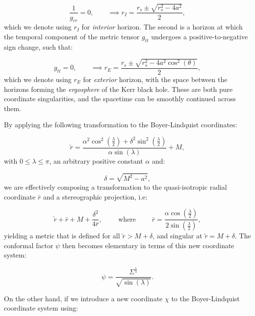 \documentclass{article}
\begin{document}
\begin{equation}
\frac{1}{g_{r r}} = 0, \qquad \implies r_I = \frac{r_s \pm \sqrt{r_{s}^{2} - 4 a^2}}{2},
\end{equation}
which we denote using ${r_I}$ for \textit{interior} horizon. The second is a horizon at which the temporal component of the metric tensor ${g_{t t}}$ undergoes a positive-to-negative sign change, such that:

\begin{equation}
g_{t t} = 0, \qquad \implies r_E = \frac{r_s \pm \sqrt{r_{s}^{2} - 4 a^2 \cos^2 \left( \theta \right)}}{2},
\end{equation}
which we denote using ${r_E}$ for \textit{exterior} horizon, with the space between the horizons forming the \textit{ergosphere} of the Kerr black hole. These are both pure coordinate singularities, and the spacetime can be smoothly continued across them.

By applying the following transformation to the Boyer-Lindquist coordinates:

\begin{equation}
\tilde{r} = \frac{\alpha^2 \cos^2 \left( \frac{\lambda}{2} \right) + \delta^2 \sin^2 \left( \frac{\lambda}{2} \right)}{\alpha \sin \left( \lambda \right)} + M,
\end{equation}
with ${0 \leq \lambda \leq \pi}$, an arbitrary positive constant ${\alpha}$ and:

\begin{equation}
\delta = \sqrt{M^2 - a^2},
\end{equation}
we are effectively composing a transformation to the quasi-isotropic radial coordinate ${\bar{r}}$ and a stereographic projection, i.e:

\begin{equation}
\tilde{r} + \bar{r} + M + \frac{\delta^2}{4 \bar{r}}, \qquad \text{ where } \qquad \bar{r} = \frac{\alpha \cos \left( \frac{\lambda}{2} \right)}{2 \sin \left( \frac{\lambda}{2} \right)},
\end{equation}
yielding a metric that is defined for all ${\tilde{r} > M + \delta}$, and singular at ${\tilde{r} = M + \delta}$. The conformal factor ${\psi}$ then becomes elementary in terms of this new coordinate system:

\begin{equation}
\psi = \frac{\Sigma^{\frac{1}{4}}}{\sqrt{\sin \left( \lambda \right)}}.
\end{equation}

On the other hand, if we introduce a new coordinate ${\chi}$ to the Boyer-Lindquist coordinate system using:
\end{document}
